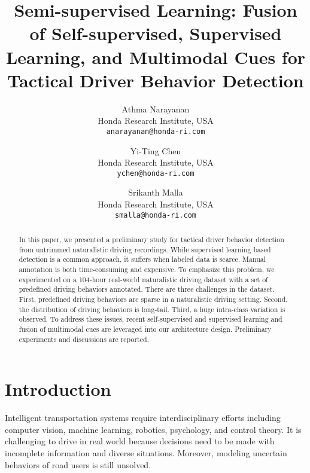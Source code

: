 \documentclass[10pt,twocolumn,letterpaper]{article}
\begin{document}
\title{Semi-supervised Learning: Fusion of Self-supervised, Supervised Learning, and Multimodal Cues for Tactical Driver Behavior Detection}

\author{Athma Narayanan\\
Honda Research Institute, USA\\
{\tt\small anarayanan@honda-ri.com}
\and
Yi-Ting Chen\\
Honda Research Institute, USA\\
{\tt\small ychen@honda-ri.com}\\
\and
Srikanth Malla\\
Honda Research Institute, USA\\
{\tt\small smalla@honda-ri.com}\\
}

\maketitle

\begin{abstract}
   In this paper, we presented a preliminary study for tactical driver behavior detection from untrimmed naturalistic driving recordings. While supervised learning based detection is a common approach, it suffers when labeled data is scarce. Manual annotation is both time-consuming and expensive. To emphasize this problem, we experimented on a 104-hour real-world naturalistic driving dataset with a set of predefined driving behaviors annotated. There are three challenges in the dataset. First, predefined driving behaviors are sparse in a naturalistic driving setting. Second, the distribution of driving behaviors is long-tail. Third, a huge intra-class variation is observed. To address these issues, recent self-supervised and supervised learning and fusion of multimodal cues are leveraged into our architecture design. Preliminary experiments and discussions are reported.          
\end{abstract}

\section{Introduction}
Intelligent transportation systems require interdisciplinary efforts including computer vision, machine learning, robotics, psychology, and control theory. It is challenging to drive in real world because decisions need to be made with incomplete information and diverse situations. Moreover, modeling uncertain behaviors of road users is still unsolved.
\end{document}
